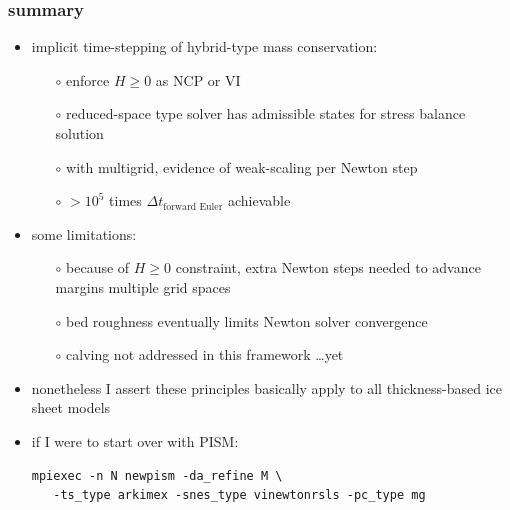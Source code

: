 \documentclass[hide notes,intlimits,usenames,dvipsnames]{beamer}
\begin{document}
\begin{frame}[fragile]
\frametitle{summary}
\begin{itemize}
\item implicit time-stepping of hybrid-type mass conservation:
  \begin{itemize}
  \item[$\circ$] enforce $H\ge 0$ as NCP or VI
  \item[$\circ$] reduced-space type solver has admissible states for stress balance solution
  \item[$\circ$] with multigrid, evidence of weak-scaling per Newton step
  \item[$\circ$] $>10^5$ times $\Delta t_{\text{forward Euler}}$ achievable
  \end{itemize}
\item some limitations:
  \begin{itemize}
  \item[$\circ$] because of $H\ge 0$ constraint, extra Newton steps needed to advance margins multiple grid spaces
  \item[$\circ$] bed roughness eventually limits Newton solver convergence
  \item[$\circ$] calving not addressed in this framework \dots yet
  \end{itemize}

\bigskip
\item nonetheless I assert these principles basically apply to all thickness-based ice sheet models
\item if I were to start over with PISM:
\scriptsize
\begin{verbatim}
mpiexec -n N newpism -da_refine M \
   -ts_type arkimex -snes_type vinewtonrsls -pc_type mg
\end{verbatim}
\end{itemize}
\end{frame}
\end{document}
